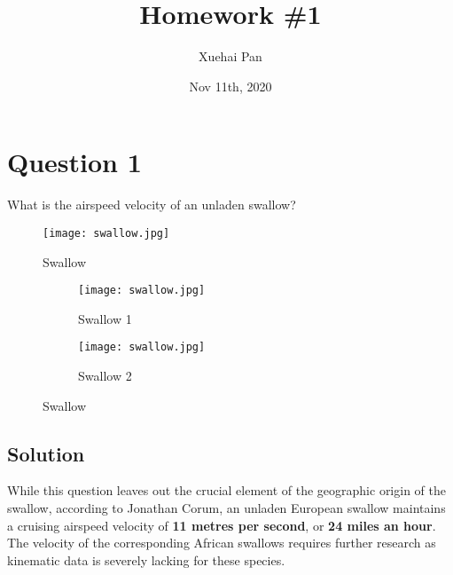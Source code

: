 \documentclass[
  UTF8, %
  12pt, %
]{assignment}
\title{Homework \#1} %
\author{Xuehai Pan} %
\date{Nov 11th, 2020} %
\institute{School of Electronics Engineering and Computer Science \\ Peking University} %
\begin{document}
\maketitle %


\section*{Question 1}

\begin{problem}
What is the airspeed velocity of an unladen swallow?
\end{problem}

\begin{figure}[H]
  \centering
  \texttt{[image: swallow.jpg]} %
  \caption{Swallow}
  \label{fig:swallow}
\end{figure}

\begin{figure}[H]
  \centering
  \begin{subfigure}[b]{0.4\textwidth}
    \texttt{[image: swallow.jpg]}
    \caption{Swallow 1}
    \label{fig:swallow_1}
  \end{subfigure} \quad
  \begin{subfigure}[b]{0.4\textwidth}
    \texttt{[image: swallow.jpg]}
    \caption{Swallow 2}
    \label{fig:swallow_2}
  \end{subfigure}
  \caption{Swallow}
  \label{fig:swallow_all}
\end{figure}


\subsection*{Solution}

While this question leaves out the crucial element of the geographic origin of the swallow, according to Jonathan Corum, an unladen European swallow maintains a cruising airspeed velocity of \textbf{11 metres per second}, or \textbf{24 miles an hour}. The velocity of the corresponding African swallows requires further research as kinematic data is severely lacking for these species.
\end{document}
